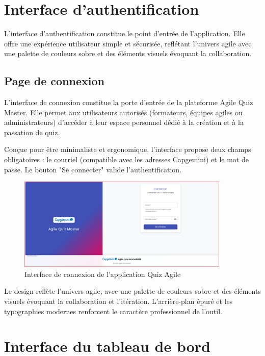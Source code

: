 \documentclass[12pt,a4paper]{report}
\begin{document}
\section{Interface d'authentification}

L'interface d'authentification constitue le point d'entrée de l'application. Elle offre une expérience utilisateur simple et sécurisée, reflétant l'univers agile avec une palette de couleurs sobre et des éléments visuels évoquant la collaboration.

\subsection{Page de connexion}

L'interface de connexion constitue la porte d'entrée de la plateforme Agile Quiz Master. Elle permet aux utilisateurs autorisés (formateurs, équipes agiles ou administrateurs) d'accéder à leur espace personnel dédié à la création et à la passation de quiz.

Conçue pour être minimaliste et ergonomique, l'interface propose deux champs obligatoires : le courriel (compatible avec les adresses Capgemini) et le mot de passe. Le bouton "Se connecter" valide l'authentification.

\begin{figure}[H]
\centering
\includegraphics[width=0.9\textwidth]{latex_media/media/image51.png}
\caption{Interface de connexion de l'application Quiz Agile}
\label{fig:interface-connexion}
\end{figure}

Le design reflète l'univers agile, avec une palette de couleurs sobre et des éléments visuels évoquant la collaboration et l'itération. L'arrière-plan épuré et les typographies modernes renforcent le caractère professionnel de l'outil.

\section{Interface du tableau de bord}
\end{document}
